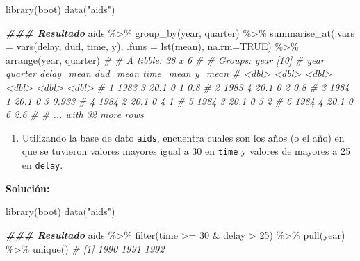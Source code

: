 \documentclass[
]{article}
\newenvironment{Shaded}{\begin{snugshade}}{\end{snugshade}}
\newcommand{\AttributeTok}[1]{\textcolor[rgb]{0.77,0.63,0.00}{#1}}
\newcommand{\CommentTok}[1]{\textcolor[rgb]{0.56,0.35,0.01}{\textit{#1}}}
\newcommand{\ConstantTok}[1]{\textcolor[rgb]{0.00,0.00,0.00}{#1}}
\newcommand{\DecValTok}[1]{\textcolor[rgb]{0.00,0.00,0.81}{#1}}
\newcommand{\DocumentationTok}[1]{\textcolor[rgb]{0.56,0.35,0.01}{\textbf{\textit{#1}}}}
\newcommand{\FunctionTok}[1]{\textcolor[rgb]{0.00,0.00,0.00}{#1}}
\newcommand{\NormalTok}[1]{#1}
\newcommand{\SpecialCharTok}[1]{\textcolor[rgb]{0.00,0.00,0.00}{#1}}
\newcommand{\StringTok}[1]{\textcolor[rgb]{0.31,0.60,0.02}{#1}}
\providecommand{\tightlist}{%
  \setlength{\itemsep}{0pt}\setlength{\parskip}{0pt}}
\theoremstyle{definition}
\theoremstyle{definition}
\theoremstyle{definition}
\theoremstyle{definition}
\theoremstyle{remark}
\begin{document}
\begin{Shaded}
\begin{Highlighting}[]
\FunctionTok{library}\NormalTok{(boot)}
\FunctionTok{data}\NormalTok{(}\StringTok{"aids"}\NormalTok{)}

\DocumentationTok{\#\#\# Resultado}
\NormalTok{aids }\SpecialCharTok{\%\textgreater{}\%} 
  \FunctionTok{group\_by}\NormalTok{(year, quarter) }\SpecialCharTok{\%\textgreater{}\%} 
  \FunctionTok{summarise\_at}\NormalTok{(}\AttributeTok{.vars =} \FunctionTok{vars}\NormalTok{(delay, dud, time, y),}
               \AttributeTok{.funs =} \FunctionTok{lst}\NormalTok{(mean), }\AttributeTok{na.rm=}\ConstantTok{TRUE}\NormalTok{) }\SpecialCharTok{\%\textgreater{}\%} 
  \FunctionTok{arrange}\NormalTok{(year, quarter)}
\CommentTok{\# \# A tibble: 38 x 6}
\CommentTok{\# \# Groups:   year [10]}
\CommentTok{\#    year quarter delay\_mean dud\_mean time\_mean y\_mean}
\CommentTok{\#   \textless{}dbl\textgreater{}   \textless{}dbl\textgreater{}      \textless{}dbl\textgreater{}    \textless{}dbl\textgreater{}     \textless{}dbl\textgreater{}  \textless{}dbl\textgreater{}}
\CommentTok{\# 1  1983       3       20.1        0         1  0.8  }
\CommentTok{\# 2  1983       4       20.1        0         2  0.8  }
\CommentTok{\# 3  1984       1       20.1        0         3  0.933}
\CommentTok{\# 4  1984       2       20.1        0         4  1    }
\CommentTok{\# 5  1984       3       20.1        0         5  2    }
\CommentTok{\# 6  1984       4       20.1        0         6  2.6  }
\CommentTok{\# \# ... with 32 more rows}
\end{Highlighting}
\end{Shaded}

\begin{enumerate}
\def\labelenumi{\arabic{enumi}.}
\tightlist
\item
  Utilizando la base de dato \texttt{aids}, encuentra cuales son los años (o el año) en que se tuvieron valores mayores igual a 30 en \texttt{time} y valores de mayores a 25 en \texttt{delay}.
\end{enumerate}

\textbf{Solución:}

\begin{Shaded}
\begin{Highlighting}[]
\FunctionTok{library}\NormalTok{(boot)}
\FunctionTok{data}\NormalTok{(}\StringTok{"aids"}\NormalTok{)}

\DocumentationTok{\#\#\# Resultado}
\NormalTok{aids }\SpecialCharTok{\%\textgreater{}\%} 
  \FunctionTok{filter}\NormalTok{(time }\SpecialCharTok{\textgreater{}=} \DecValTok{30} \SpecialCharTok{\&}\NormalTok{ delay }\SpecialCharTok{\textgreater{}} \DecValTok{25}\NormalTok{) }\SpecialCharTok{\%\textgreater{}\%} 
  \FunctionTok{pull}\NormalTok{(year) }\SpecialCharTok{\%\textgreater{}\%} 
  \FunctionTok{unique}\NormalTok{()}
\CommentTok{\# [1] 1990 1991 1992}
\end{Highlighting}
\end{Shaded}
\end{document}
